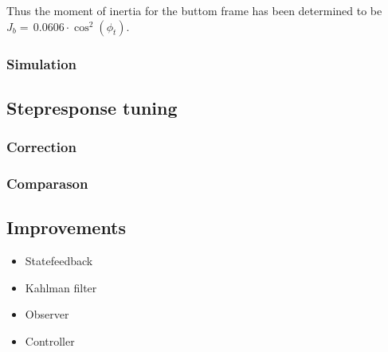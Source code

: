\documentclass[../../main]{subfiles}
\begin{document}
Thus the moment of inertia for the buttom frame has been determined to be
\newline $J_b =\, 0.0606\cdot \cos^2(\phi_t)$.




\subsubsection{Simulation}

\subsection{Stepresponse tuning}
\subsubsection{Correction}
\subsubsection{Comparason}

\subsection{Improvements}

\begin{itemize}
  \item Statefeedback
  \item Kahlman filter
  \item Observer
  \item Controller
\end{itemize}
\end{document}
